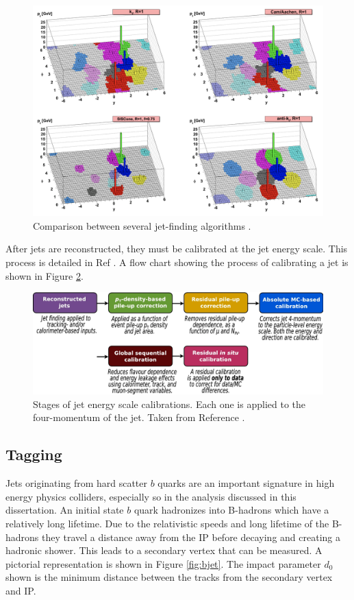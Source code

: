 		\begin{figure}[!ht]
		\centering
		\includegraphics[width=.5\textwidth,keepaspectratio=true]{chapters/chapter5_eventreconnstruction/images/anti-kt-comparison.png}
		\caption{\label{fig:anti-kt-comparison} Comparison between several jet-finding algorithms \cite{anti-kt}.}
		\end{figure}

		After jets are reconstructed, they must be calibrated at the jet energy scale. This process is detailed in Ref \cite{jet-calibration}. A flow chart showing the process of calibrating a jet is shown in Figure \ref{fig:jet-calibration-diagram}.

		\begin{figure}[!ht]
			\centering
			\includegraphics[width=\textwidth,keepaspectratio=true]{chapters/chapter5_eventreconnstruction/images/jet_calibration_diagram.png}
			\caption{\label{fig:jet-calibration-diagram} Stages of jet energy scale calibrations. Each one is applied to the four-momentum of the jet. Taken from Reference \cite{jet-calibration}. }
		\end{figure}

		\subsection{\bjet Tagging}\label{ssec:flavor-tagging}
			Jets originating from hard scatter $b$ quarks are an important signature in high energy physics colliders, especially so in the analysis discussed in this dissertation. An initial state $b$ quark hadronizes into B-hadrons which have a relatively long lifetime. Due to the relativistic speeds and long lifetime of the B-hadrons they travel a distance away from the \gls{IP} before decaying and creating a hadronic shower. This leads to a secondary vertex that can be measured. A pictorial representation is shown in Figure \ref{fig:bjet}. The impact parameter $d_0$ shown is the minimum distance between the tracks from the secondary vertex and \gls{IP}. 

